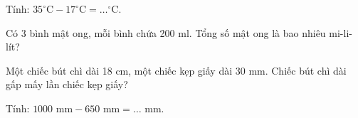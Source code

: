 \begin{ex}
Tính: $35^\circ\text{C} - 17^\circ\text{C} = \dots^\circ\text{C}$.
\end{ex}

\begin{ex}
Có 3 bình mật ong, mỗi bình chứa 200 ml. Tổng số mật ong là bao nhiêu mi-li-lít?
\end{ex}

\begin{ex}
Một chiếc bút chì dài 18 cm, một chiếc kẹp giấy dài 30 mm. Chiếc bút chì dài gấp mấy lần chiếc kẹp giấy?
\end{ex}

\begin{ex}
Tính: $1000\text{ mm} - 650\text{ mm} = \dots\text{ mm}$.
\end{ex}

